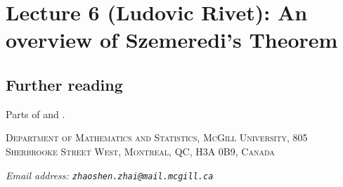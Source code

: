 \documentclass[reqno, twoside]{article}
\begin{document}
    \section{Lecture 6 (Ludovic Rivet): An overview of Szemeredi's Theorem}\label{sec:6}

    \TODO

    {\vspace{-0.1in}\small\subsection*{Further reading}Parts of \cite[Lectures 13 to 17]{Tse22} and \cite[Lecture 10]{Tao08}.}

    \printbibliography

    {\footnotesize
        \textsc{Department of Mathematics and Statistics, McGill University, 805 Sherbrooke Street West, Montreal, QC, H3A 0B9, Canada}

        \textit{Email address: \tt{zhaoshen.zhai@mail.mcgill.ca}}
    }
\end{document}
